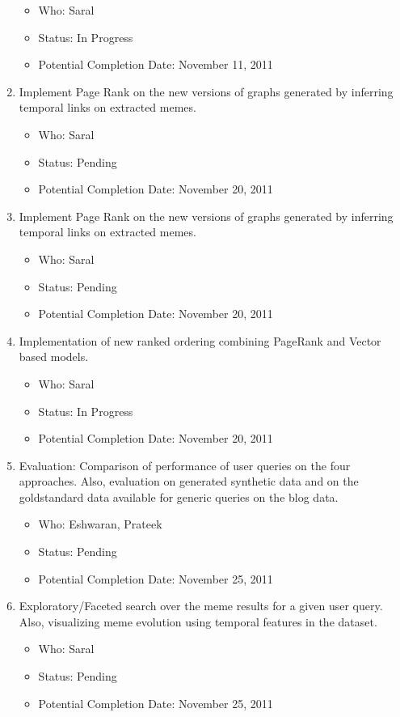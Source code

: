 \documentclass{acm_proc_article-sp}
\begin{document}
\begin{enumerate}
\begin{itemize}
	\item Who: Saral
	\item Status: In Progress
	\item Potential Completion Date: November 11, 2011
	\end{itemize}	
  \item Implement Page Rank on the new versions of graphs generated by inferring temporal links on extracted memes. \begin{itemize}
	\item Who: Saral
	\item Status: Pending
	\item Potential Completion Date: November 20, 2011
		\end{itemize}
  \item Implement Page Rank on the new versions of graphs generated by inferring temporal links on extracted memes. \begin{itemize}
	\item Who: Saral
	\item Status: Pending
	\item Potential Completion Date: November 20, 2011
	\end{itemize}
  \item Implementation of new ranked ordering combining PageRank and Vector based models. \begin{itemize}
	\item Who: Saral
	\item Status: In Progress
	\item Potential Completion Date: November 20, 2011
	\end{itemize}
  \item Evaluation: Comparison of performance of user queries on the four approaches. Also, evaluation on generated synthetic data and on the goldstandard data available for generic queries on the blog data. \begin{itemize}
	\item Who: Eshwaran, Prateek
	\item Status: Pending
	\item Potential Completion Date: November 25, 2011
	\end{itemize}
  \item Exploratory/Faceted search over the meme results for a given user query. Also, visualizing meme evolution using temporal features in the dataset. \begin{itemize}
	\item Who: Saral
	\item Status: Pending
	\item Potential Completion Date: November 25, 2011
	\end{itemize}
\end{enumerate}
\end{document}
